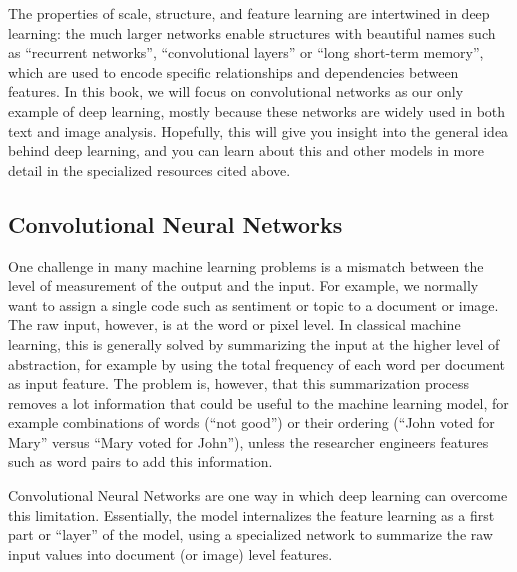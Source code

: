 The properties of scale, structure, and feature learning are intertwined in deep learning: the much larger networks enable structures with beautiful names such as ``recurrent networks'', ``convolutional layers'' or ``long short-term memory'',
which are used to encode specific relationships and dependencies between features.
In this book, we will focus on convolutional networks as our only example of deep learning,
mostly because these networks are widely used in both text and image analysis.
Hopefully, this will give you insight into the general idea behind deep learning,
and you can learn about this and other models in more detail in the specialized resources cited above.

\subsection{Convolutional Neural Networks}
\label{sec:cnnbasis}

One challenge in many machine learning problems is a mismatch between the level of measurement of the output and the input.
For example, we normally want to  assign a single code such as sentiment or topic to a document or image.
The raw input, however, is at the word or pixel level.
In classical machine learning, this is generally solved by summarizing the input at the higher level of abstraction,
for example by using the total frequency of each word per document as input feature.
The problem is, however, that this summarization process removes a lot information that could be useful to the machine learning model,
for example combinations of words (``not good'') or their ordering (``John voted for Mary'' versus ``Mary voted for John''),
unless the researcher engineers features such as word pairs to add this information.

Convolutional Neural Networks are one way in which deep learning can overcome this limitation.
Essentially, the model internalizes the feature learning as a first part or ``layer'' of the model,
using a specialized network to summarize the raw input values into document (or image) level features.



